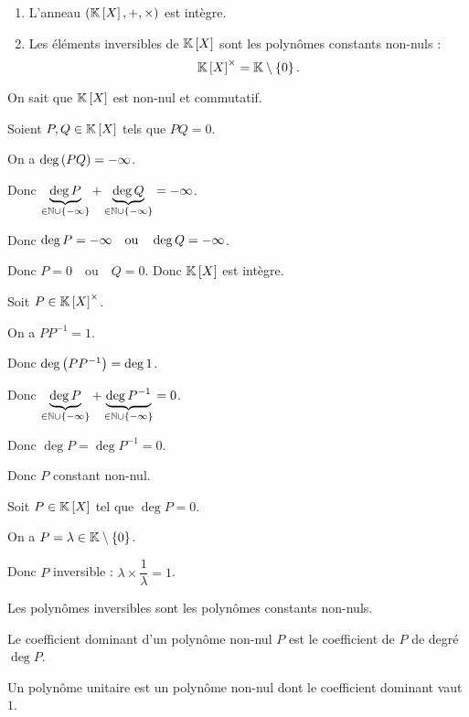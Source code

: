 \begin{prop}
\begin{enumerate}
\item L'anneau \(\anneau{\poly}\) est intègre. \\

\item Les éléments inversibles de \(\poly\) sont les polynômes constants non-nuls : \[\poly\croix=\K\excluant\accol{0}.\]
\end{enumerate}
\end{prop}

\begin{dem}[1]
On sait que \(\poly\) est non-nul et commutatif.

Soient \(P,Q\in\poly\) tels que \(PQ=0\).

On a \(\deg\left(PQ\right)=-\infty\).

Donc \(\underbrace{\deg P}_{\in\mathbb{N}\cup\left\lbrace-\infty\right\rbrace}+\underbrace{\deg Q}_{\in\mathbb{N}\cup\left\lbrace-\infty\right\rbrace}=-\infty\).

Donc \(\deg P=-\infty\quad\text{ou}\quad\deg Q=-\infty\).

Donc \(P=0\quad\text{ou}\quad Q=0\). Donc \(\poly\) est intègre.
\end{dem}

\begin{dem}[2]
\analyse

Soit \(P\in\poly\croix\).

On a \(PP^{-1}=1\).

Donc \(\deg\left(PP^{-1}\right)=\deg1\).

Donc \(\underbrace{\deg P}_{\in\mathbb{N}\cup\left\lbrace-\infty\right\rbrace}+\underbrace{\deg P^{-1}}_{\in\mathbb{N}\cup\left\lbrace-\infty\right\rbrace}=0\).

Donc \(\deg P=\deg P^{-1}=0\).

Donc \(P\) constant non-nul.

\synthese

Soit \(P\in\poly\) tel que \(\deg P=0\).

On a \(P=\lambda\in\mathbb{K}\setminus\left\lbrace0\right\rbrace\).

Donc \(P\) inversible : \(\lambda\times\dfrac{1}{\lambda}=1\).

\conclusion

Les polynômes inversibles sont les polynômes constants non-nuls.
\end{dem}

\begin{defi}
Le coefficient dominant d'un polynôme non-nul \(P\) est le coefficient de \(P\) de degré \(\deg P\).

Un polynôme unitaire est un polynôme non-nul dont le coefficient dominant vaut \(1\).
\end{defi}

